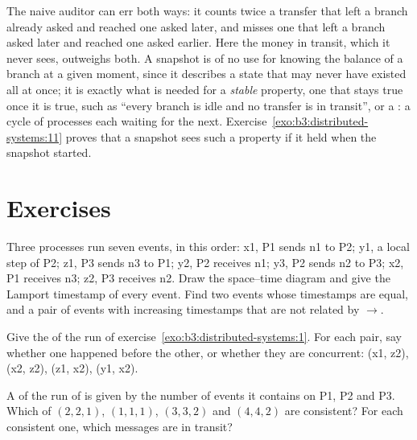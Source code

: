 The naive auditor can err both ways: it counts twice a transfer that left a branch already asked and reached one asked later, and misses one that left a branch asked later and reached one asked earlier. Here the money in transit, which it never sees, outweighs both. A snapshot is of no use for knowing the balance of a branch at a given moment, since it describes a state that may never have existed all at once; it is exactly what is needed for a \emph{stable} property, one that stays true once it is true, such as ``every branch is idle and no transfer is in transit'', or a : a cycle of processes each waiting for the next. Exercise~\ref{exo:b3:distributed-systems:11} proves that a snapshot sees such a property if it held when the snapshot started.

\section{Exercises}\label{sec:b3:distributed-systems:exercises}

\begin{exercise}[$\star$]\label{exo:b3:distributed-systems:1}
Three processes run seven events, in this order: x1, P1 sends n1 to P2; y1, a local step of P2; z1, P3 sends n3 to P1; y2, P2 receives n1; y3, P2 sends n2 to P3; x2, P1 receives n3; z2, P3 receives n2. Draw the space--time diagram and give the Lamport timestamp of every event. Find two events whose timestamps are equal, and a pair of events with increasing timestamps that are not related by $\to$.
\end{exercise}

\begin{exercise}[$\star$]\label{exo:b3:distributed-systems:2}
Give the  of the run of exercise~\ref{exo:b3:distributed-systems:1}. For each pair, say whether one happened before the other, or whether they are concurrent: (x1, z2), (x2, z2), (z1, x2), (y1, x2).
\end{exercise}

\begin{exercise}[$\star$]\label{exo:b3:distributed-systems:3}
A  of the run of  is given by the number of events it contains on P1, P2 and P3. Which of $(2, 2, 1)$, $(1, 1, 1)$, $(3, 3, 2)$ and $(4, 4, 2)$ are consistent? For each consistent one, which messages are in transit?
\end{exercise}

